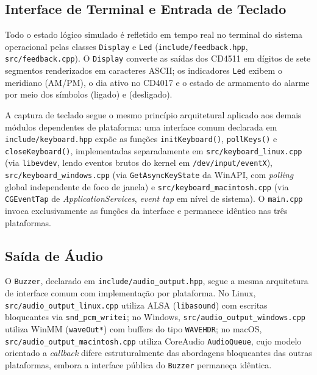 \documentclass[12pt]{article}
\begin{document}
\subsection{Interface de Terminal e Entrada de Teclado}

Todo o estado lógico simulado é refletido em tempo real no terminal do sistema operacional pelas classes \texttt{Display} e \texttt{Led} (\texttt{include/feedback.hpp}, \texttt{src/feedback.cpp}). O \texttt{Display} converte as saídas dos CD4511 em dígitos de sete segmentos renderizados em caracteres ASCII; os indicadores \texttt{Led} exibem o meridiano (AM/PM), o dia ativo no CD4017 e o estado de armamento do alarme por meio dos símbolos \texttt{\textbullet} (ligado) e \texttt{\textopenbullet} (desligado).

A captura de teclado segue o mesmo princípio arquitetural aplicado aos demais módulos dependentes de plataforma: uma interface comum declarada em \texttt{include/keyboard.hpp} expõe as funções \texttt{initKeyboard()}, \texttt{pollKeys()} e \texttt{closeKeyboard()}, implementadas separadamente em \texttt{src/keyboard\_linux.cpp} (via \texttt{libevdev}, lendo eventos brutos do kernel em \texttt{/dev/input/eventX}), \texttt{src/keyboard\_windows.cpp} (via \texttt{GetAsyncKeyState} da WinAPI, com \textit{polling} global independente de foco de janela) e \texttt{src/keyboard\_macintosh.cpp} (via \texttt{CGEventTap} de \textit{ApplicationServices}, \textit{event tap} em nível de sistema). O \texttt{main.cpp} invoca exclusivamente as funções da interface e permanece idêntico nas três plataformas.

\subsection{Saída de Áudio}

O \texttt{Buzzer}, declarado em \texttt{include/audio\_output.hpp}, segue a mesma arquitetura de interface comum com implementação por plataforma. No Linux, \texttt{src/audio\_output\_linux.cpp} utiliza ALSA (\texttt{libasound}) com escritas bloqueantes via \texttt{snd\_pcm\_writei}; no Windows, \texttt{src/audio\_output\_windows.cpp} utiliza WinMM (\texttt{waveOut*}) com buffers do tipo \texttt{WAVEHDR}; no macOS, \texttt{src/audio\_output\_macintosh.cpp} utiliza CoreAudio \texttt{AudioQueue}, cujo modelo orientado a \textit{callback} difere estruturalmente das abordagens bloqueantes das outras plataformas, embora a interface pública do \texttt{Buzzer} permaneça idêntica.
\end{document}
